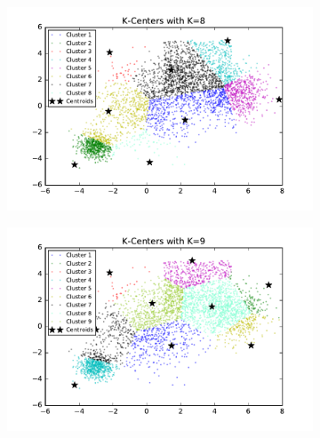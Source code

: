 \begin{description}
\begin{description}
\begin{figure}[!h]
\begin{subfigure}[b]{0.475\textwidth}
        \end{subfigure}
        \hfill
        \begin{subfigure}[b]{0.475\textwidth}  
            \centering 
            \includegraphics[width=\textwidth]{./figures/bigClustering_kCenter_8.pdf}
        \end{subfigure}
        \begin{subfigure}[b]{0.475\textwidth}   
            \centering 
            \includegraphics[width=\textwidth]{./figures/bigClustering_kCenter_9.pdf}
        \end{subfigure}
        \hfill
        \begin{subfigure}[b]{0.475\textwidth}   
            \centering 

\end{subfigure}
\end{figure}
\end{description}
\end{description}
